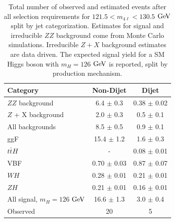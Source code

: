 \renewcommand{\arraystretch}{0.8}
\begin{table}[htbp]
\begin{center}
\begin{tabular}{l|c|c}
\hline \hline
      Category       & Non-Dijet  &   Dijet  \\
      \hline
      $ZZ$ background &  6.4  $\pm$  0.3  &  0.38 $\pm$  0.02  \\
      $Z$ + X background &  2.0  $\pm$  0.3  &  0.5  $\pm$  0.1  \\
      \hline
      All backgrounds       &  8.5  $\pm$  0.5  &  0.9  $\pm$ 0.1 \\
      \hline
      ggF               &  15.4 $\pm$  1.2   &   1.6  $\pm$  0.3 \\
      $t\bar{t}H$           &         -          &  0.08  $\pm$  0.01 \\
      VBF                   &  0.70 $\pm$  0.03  &  0.87  $\pm$  0.07 \\
      $WH$              &  0.28 $\pm$  0.01  &  0.21  $\pm$  0.01 \\
      $ZH$             &  0.21 $\pm$  0.01  &  0.16  $\pm$  0.01 \\
      \hline
      All signal, $m_{H}=126$ $\rm{GeV}$            &  16.6 $\pm$  1.3  &  3.0  $\pm$  0.4 \\
      \hline
      Observed              & 20 & 5 \\
      \hline
\end{tabular}
\caption[Number of Observed $4\ell$ Events in $121.5 < m_{4\ell} < 130.5$ $\rm{GeV}$ Split by Jet Categorization and Production Mechanism]{Total number of observed and estimated events after all selection requirements for $121.5 < m_{4\ell} < 130.5$ $\rm{GeV}$ split by jet categorization. Estimates for signal and irreducible $ZZ$ background come from Monte Carlo simulations. Irreducible $Z+X$ background estimates are data driven. The expected signal yield for a SM Higgs boson with $m_{H} = 126$ $\rm{GeV}$ is reported, split by production mechanism.
\label{tbl:ZZ4lEventsByJetCat}}
\end{center}
\end{table}

